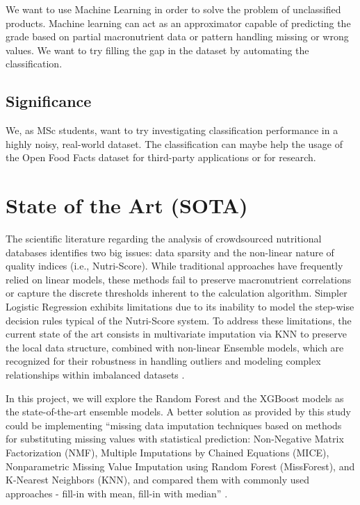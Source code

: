 \documentclass[11pt,a4paper]{article}
\begin{document}
We want to use Machine Learning in order to solve the problem of unclassified products. Machine learning can act as an approximator capable of predicting the grade based on partial macronutrient data or pattern handling missing or wrong values.
We want to try filling the gap in the dataset by automating the classification.

\subsection{Significance}

We, as MSc students, want to try investigating classification performance in a highly noisy, real-world dataset.
The classification can maybe help the usage of the Open Food Facts dataset for third-party applications or for research.

\section{State of the Art (SOTA)}

The scientific literature regarding the analysis of crowdsourced nutritional databases identifies two big issues: data sparsity and the non-linear nature of quality indices (i.e., Nutri-Score).
While traditional approaches have frequently relied on linear models, these methods fail to preserve macronutrient correlations or capture the discrete thresholds inherent to the calculation algorithm. Simpler Logistic Regression exhibits limitations due to its inability to model the step-wise decision rules typical of the Nutri-Score system.
To address these limitations, the current state of the art consists in multivariate imputation via KNN to preserve the local data structure, combined with non-linear Ensemble models, which are recognized for their robustness in handling outliers and modeling complex relationships within imbalanced datasets \cite{ensemble}.

In this project, we will explore the Random Forest and the XGBoost models as the state-of-the-art ensemble models.
A better solution as provided by this study could be implementing ``missing data imputation techniques based on methods for substituting missing values with statistical prediction: Non-Negative Matrix Factorization (NMF), Multiple Imputations by Chained Equations (MICE), Nonparametric Missing Value Imputation using Random Forest (MissForest), and K-Nearest Neighbors (KNN), and compared them with commonly used approaches - fill-in with mean, fill-in with median'' \cite{imputation}.
\end{document}
